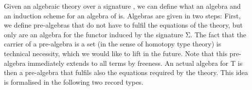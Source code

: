 \documentclass{easychair}
\begin{document}
Given an algebraic theory
 \ofT {}
over a signature , we can define what an algebra and an induction
scheme for an algebra of  is.
Algebras are given in two steps: First, we define pre-algebras that do not have
to fulfil the equations of the theory, but only are an algebra for the functor
induced by the signature Σ.
The fact that the carrier of a pre-algebra is a set (in the sense of homotopy
type theory) is technical necessity, which we would like to lift in the future.
Note that this pre-algebra immediately extends to all terms by freeness.
An actual algebra for T is then a pre-algebra that fulfils also the equations
required by the theory.
This idea is formalised in the following two record types.
\newpage
\begin{code}%
\>[0][@{}l@{\AgdaIndent{1}}]%
\>[2]\AgdaSpace{}%
\AgdaSpace{}%
\AgdaSymbol{:}\AgdaSpace{}%
\UO
{}\AgdaSpace{}%
\<%
\\
\>[2][@{}l@{\AgdaIndent{0}}]%
\>[4][@{}l@{\AgdaIndent{0}}]%
\>[6]%
\>[19]\AgdaSymbol{:}\AgdaSpace{}%
\UZ\AgdaSpace{}%
\<%
\\
\>[4][@{}l@{\AgdaIndent{0}}]%
\>[6]%
\>[19]\AgdaSymbol{:}\AgdaSpace{}%
\AgdaSpace{}%
\<%
\\
%
\>[6]%
\>[15]\AgdaSymbol{:}\AgdaSpace{}%
\AgdaSymbol{(}\AgdaSpace{}%
\AgdaSymbol{:}\AgdaSpace{}%
\AgdaSpace{}\AgdaSymbol{)}\AgdaSpace{}%
\AgdaSymbol{(}\AgdaSpace{}%
\AgdaSymbol{:}\AgdaSpace{}%
\AgdaSpace{}%
\AgdaSpace{}%
\AgdaSpace{}%
\AgdaSpace{}%
\AgdaSymbol{)}\AgdaSpace{}%
\AgdaSpace{}%
\<%
\\
%
\\[\AgdaEmptyExtraSkip]%
%
\>[4]\AgdaSpace{}%
\AgdaSymbol{:}\AgdaSpace{}%
\AgdaSpace{}%
\AgdaSpace{}%
\AgdaSpace{}%
\AgdaSpace{}%
\<%
\\
%
\>[4]\AgdaSpace{}%
\AgdaSymbol{=}\AgdaSpace{}%
\AgdaSpace{}%
\AgdaSpace{}%
\AgdaSpace{}%
\AgdaSpace{}%

\end{code}
\end{document}
